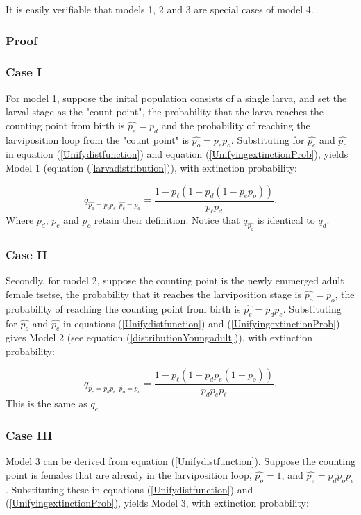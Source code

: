 \documentclass[smallextended]{svjour3}
\begin{document}
It is easily verifiable that models 1, 2 and 3 are special cases of model 4. 

\subsubsection*{Proof}

\subsubsection*{Case I}
For model 1, suppose the inital population consists of a single larva, and  set the larval stage as the "count point", the probability that the larva reaches the counting point from birth is $\hat{p_e}=p_{d}$ and the probability of reaching the larviposition loop from the "count point" is $\hat{p_o} = p_{e}p_{o}$. Substituting for $\hat{p_e}$ and $\hat{p_o}$ in equation (\ref{Unifydistfunction}) and equation (\ref{UnifyingextinctionProb}), yields Model 1 (equation (\ref{larvadistribution})), with extinction probability:

 $$q_{\hat{p_d}= p_{o}p_{e},\hat{p_e}=p_{d}} =  \frac{1-p_{\ell}(1 - p_{d}(1 - p_{e}p_{o}))}{p_{\ell}p_{d}}.$$
Where $p_{d}$, $p_e$ and $p_o$ retain their definition. Notice that $q_{\hat{p_o}}$ is identical to $q_{d}$.  \\


\subsubsection*{Case II}
Secondly, for model 2, suppose the counting point is the newly emmerged adult female tsetse, the probability that it reaches the larviposition stage is $\hat{p_o} = p_{o}$, the probability of reaching the counting point from birth is $\hat{p_e}=p_{d} p_{e}$. Substituting for $\hat{p_o}$ and $\hat{p_e}$ in equations (\ref{Unifydistfunction}) and (\ref{UnifyingextinctionProb}) gives Model 2 (see equation (\ref{distributionYoungadult})), with extinction probability: 

$$q_{\hat{p_e}=p_{d}p_{e},\hat{p_o}=p_{o}} = \frac{1- p_{\ell}(1 -p_{d}p_{e}(1- p_{o}))}{p_{d}p_{e}p_{\ell}}. $$
This is the same as $q_{e}$

\subsubsection*{Case III}
Model 3 can be derived from equation (\ref{Unifydistfunction}). Suppose the counting point is females that are already in the larviposition loop, $\hat{p_o}=1$, and $\hat{p_e}=p_{d}p_{o}p_{e}$. Substituting these in equations (\ref{Unifydistfunction}) and (\ref{UnifyingextinctionProb}), yields Model 3, with extinction probability:  
\end{document}
